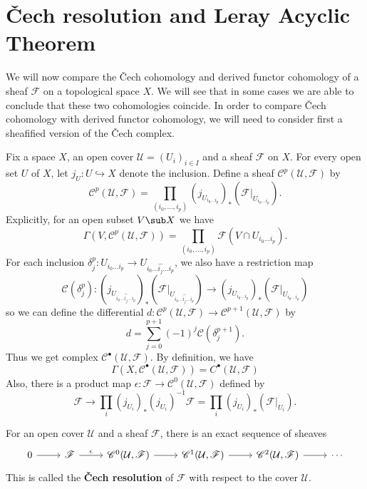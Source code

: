 \section{\v{C}ech resolution and Leray Acyclic Theorem}
We will now compare the \v{C}ech cohomology and derived functor cohomology of
a sheaf $\mathscr{F}$ on a topological space $X$. We will see that in some cases we are able to conclude that these two cohomologies coincide. In order to compare \v{C}ech cohomology with derived functor cohomology, we
will need to consider first a sheafified version of the \v{C}ech complex.\par
Fix a space $X$, an open cover $\mathcal{U}=(U_i)_{i\in I}$ and a sheaf $\mathscr{F}$ on $X$. For every open set $U$ of $X$, let $j_U:U\hookrightarrow X$ denote the inclusion. Define a sheaf $\mathscr{C}^p(\mathcal{U},\mathscr{F})$ by
\[\mathscr{C}^p(\mathcal{U},\mathscr{F})=\prod_{(i_0,\dots,i_p)}(j_{U_{i_0\dots i_p}})_*(\mathscr{F}|_{U_{i_0\dots i_p}}).\]
Explicitly, for an open subset $V\sub X$ we have
\[\Gamma(V,\mathscr{C}^p(\mathcal{U},\mathscr{F}))=\prod_{(i_0,\dots,i_p)}\mathscr{F}(V\cap U_{i_0\dots i_p}).\]
For each inclusion $\delta^p_j:U_{i_0\dots i_p}\to U_{i_0\dots\widehat{i_j}\dots i_p}$, we also have a restriction map
\[\mathscr{C}(\delta^p_j):(j_{U_{i_0\dots\widehat{i_j}\dots i_p}})_*(\mathscr{F}|_{U_{i_0\dots\widehat{i_j}\dots i_p}})\to(j_{U_{i_0\dots i_p}})_*(\mathscr{F}|_{U_{i_0\dots i_p}})\]
so we can define the differential $d:\mathscr{C}^p(\mathcal{U},\mathscr{F})\to\mathscr{C}^{p+1}(\mathcal{U},\mathscr{F})$ by
\[d=\sum_{j=0}^{p+1}(-1)^j\mathscr{C}(\delta^{p+1}_j).\]
Thus we get complex $\mathscr{C}^\bullet(\mathcal{U},\mathscr{F})$. By definition, we have
\[\Gamma(X,\mathscr{C}^\bullet(\mathcal{U},\mathscr{F}))=C^\bullet(\mathcal{U},\mathscr{F})\]
Also, there is a product map $\epsilon:\mathscr{F}\to\mathscr{C}^0(\mathcal{U},\mathscr{F})$ defined by
\[\mathscr{F}\to\prod_i(j_{U_i})_*(j_{U_i})^{-1}\mathscr{F}=\prod_i(j_{U_i})_*(\mathscr{F}|_{U_i}).\]
\begin{proposition}\label{Cech resolution}
For an open cover $\mathcal{U}$ and a sheaf $\mathscr{F}$, there is an exact sequence of sheaves
\[\begin{tikzcd}
0\ar[r]&\mathscr{F}\ar[r,"\epsilon"]&\mathscr{C}^0(\mathcal{U},\mathscr{F})\ar[r]&\mathscr{C}^1(\mathcal{U},\mathscr{F})\ar[r]&\mathscr{C}^2(\mathcal{U},\mathscr{F})\ar[r]&\cdots
\end{tikzcd}\]
This is called the \textbf{\v{C}ech resolution} of $\mathscr{F}$ with respect to the cover $\mathcal{U}$.
\end{proposition}
